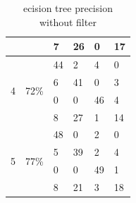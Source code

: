 \documentclass[USenglish]{ifimaster}  %
\begin{document}
\begin{table}[h]
\begin{tabular}{@{}llllll@{}}
		\multicolumn{1}{l|}{} & \multicolumn{1}{l|}{} & \multicolumn{1}{l|}{7} & \multicolumn{1}{l|}{26} & \multicolumn{1}{l|}{0} & 17 \\ \midrule
		\multicolumn{1}{l|}{\multirow{4}{*}{4}} & \multicolumn{1}{l|}{\multirow{4}{*}{72\%}} & \multicolumn{1}{l|}{44} & \multicolumn{1}{l|}{2} & \multicolumn{1}{l|}{4} & 0 \\ \cmidrule(l){3-6} 
		\multicolumn{1}{l|}{} & \multicolumn{1}{l|}{} & \multicolumn{1}{l|}{6} & \multicolumn{1}{l|}{41} & \multicolumn{1}{l|}{0} & 3 \\ \cmidrule(l){3-6} 
		\multicolumn{1}{l|}{} & \multicolumn{1}{l|}{} & \multicolumn{1}{l|}{0} & \multicolumn{1}{l|}{0} & \multicolumn{1}{l|}{46} & 4 \\ \cmidrule(l){3-6} 
		\multicolumn{1}{l|}{} & \multicolumn{1}{l|}{} & \multicolumn{1}{l|}{8} & \multicolumn{1}{l|}{27} & \multicolumn{1}{l|}{1} & 14 \\ \midrule
		\multicolumn{1}{l|}{\multirow{4}{*}{5}} & \multicolumn{1}{l|}{\multirow{4}{*}{77\%}} & \multicolumn{1}{l|}{48} & \multicolumn{1}{l|}{0} & \multicolumn{1}{l|}{2} & 0 \\ \cmidrule(l){3-6} 
		\multicolumn{1}{l|}{} & \multicolumn{1}{l|}{} & \multicolumn{1}{l|}{5} & \multicolumn{1}{l|}{39} & \multicolumn{1}{l|}{2} & 4 \\ \cmidrule(l){3-6} 
		\multicolumn{1}{l|}{} & \multicolumn{1}{l|}{} & \multicolumn{1}{l|}{0} & \multicolumn{1}{l|}{0} & \multicolumn{1}{l|}{49} & 1 \\ \cmidrule(l){3-6} 
		\multicolumn{1}{l|}{} & \multicolumn{1}{l|}{} & \multicolumn{1}{l|}{8} & \multicolumn{1}{l|}{21} & \multicolumn{1}{l|}{3} & 18 \\ \bottomrule
	\end{tabular}
	\caption{ecision tree precision without filter}
	\label{dt1e}
\end{table}
\FloatBarrier
\end{document}
